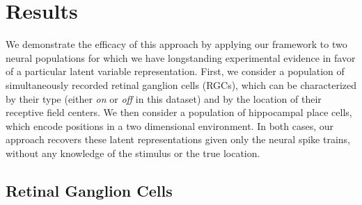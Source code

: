 \section{Results}
We demonstrate the efficacy of this approach by applying our framework 
to two neural populations for which we have longstanding experimental 
evidence in favor of a particular latent variable representation.
First, we consider a population of simultaneously recorded retinal 
ganglion cells (RGCs), which can be characterized by their type 
(either \textit{on} or \textit{off} in this dataset) and
by the location of their receptive field centers. 
We then consider a population of hippocampal place cells, which encode 
positions in a two dimensional environment. In both cases, our approach 
recovers these latent representations given only the neural spike trains,
without any knowledge of the stimulus or the true location.

\subsection{Retinal Ganglion Cells}

